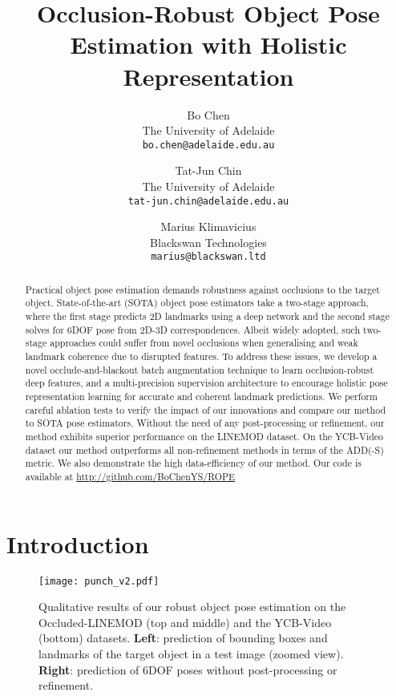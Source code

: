 \documentclass[10pt,twocolumn,letterpaper]{article}
\begin{document}
\title{Occlusion-Robust Object Pose Estimation with Holistic Representation}

\author{Bo Chen\\
The University of Adelaide\\
{\tt\small bo.chen@adelaide.edu.au}
\and
Tat-Jun Chin\\
The University of Adelaide\\
{\tt\small tat-jun.chin@adelaide.edu.au}

\and
Marius Klimavicius\\
Blackswan Technologies\\
{\tt\small marius@blackswan.ltd}

}

\maketitle
\thispagestyle{empty}

\begin{abstract}
Practical object pose estimation demands robustness against occlusions to the target object. State-of-the-art (SOTA) object pose estimators take a two-stage approach, where the first stage predicts 2D landmarks using a deep network and the second stage solves for 6DOF pose from 2D-3D correspondences. Albeit widely adopted, such two-stage approaches could suffer from novel occlusions when generalising and weak landmark coherence due to disrupted features. To address these issues, we develop a novel occlude-and-blackout batch augmentation technique to learn occlusion-robust deep features, and a multi-precision supervision architecture to encourage holistic pose representation learning for accurate and coherent landmark predictions. We perform careful ablation tests to verify the impact of our innovations and compare our method to SOTA pose estimators. Without the need of any post-processing or refinement, our method exhibits superior performance on the LINEMOD dataset. On the YCB-Video dataset our method outperforms all non-refinement methods in terms of the ADD(-S) metric. We also demonstrate the high data-efficiency of our method. Our code is available at \url{http://github.com/BoChenYS/ROPE}
\end{abstract}

\section{Introduction}

\begin{figure}
    \centering
    \texttt{[image: punch\_v2.pdf]}
    \caption{Qualitative results of our robust object pose estimation on the Occluded-LINEMOD (top and middle) and the YCB-Video (bottom) datasets.  \textbf{Left}: prediction of bounding boxes and landmarks of the target object in a test image (zoomed view). \textbf{Right}: prediction of 6DOF poses without post-processing or refinement.}
    \label{fig:punch}
\end{figure}
\end{document}
